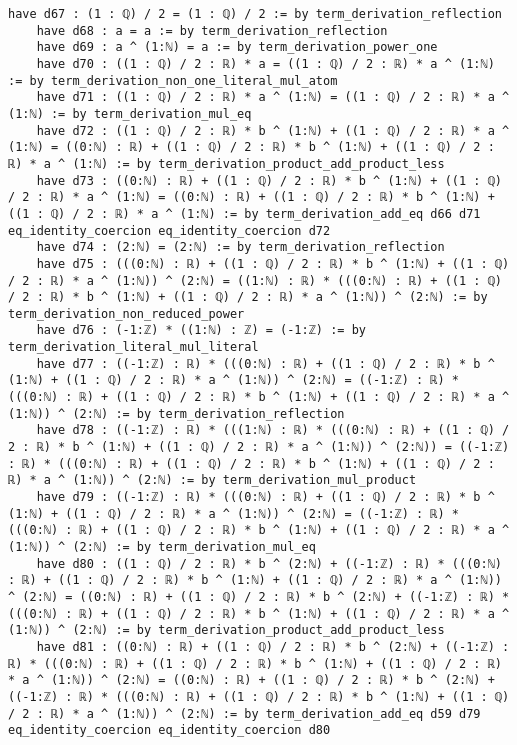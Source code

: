 \documentclass{article}
\begin{document}
\begin{tcolorbox}[colback=white!10, width=\linewidth]
\begin{lstlisting}[language=Lean4]
    have d67 : (1 : ℚ) / 2 = (1 : ℚ) / 2 := by term_derivation_reflection
    have d68 : a = a := by term_derivation_reflection
    have d69 : a ^ (1:ℕ) = a := by term_derivation_power_one
    have d70 : ((1 : ℚ) / 2 : ℝ) * a = ((1 : ℚ) / 2 : ℝ) * a ^ (1:ℕ) := by term_derivation_non_one_literal_mul_atom
    have d71 : ((1 : ℚ) / 2 : ℝ) * a ^ (1:ℕ) = ((1 : ℚ) / 2 : ℝ) * a ^ (1:ℕ) := by term_derivation_mul_eq
    have d72 : ((1 : ℚ) / 2 : ℝ) * b ^ (1:ℕ) + ((1 : ℚ) / 2 : ℝ) * a ^ (1:ℕ) = ((0:ℕ) : ℝ) + ((1 : ℚ) / 2 : ℝ) * b ^ (1:ℕ) + ((1 : ℚ) / 2 : ℝ) * a ^ (1:ℕ) := by term_derivation_product_add_product_less
    have d73 : ((0:ℕ) : ℝ) + ((1 : ℚ) / 2 : ℝ) * b ^ (1:ℕ) + ((1 : ℚ) / 2 : ℝ) * a ^ (1:ℕ) = ((0:ℕ) : ℝ) + ((1 : ℚ) / 2 : ℝ) * b ^ (1:ℕ) + ((1 : ℚ) / 2 : ℝ) * a ^ (1:ℕ) := by term_derivation_add_eq d66 d71 eq_identity_coercion eq_identity_coercion d72
    have d74 : (2:ℕ) = (2:ℕ) := by term_derivation_reflection
    have d75 : (((0:ℕ) : ℝ) + ((1 : ℚ) / 2 : ℝ) * b ^ (1:ℕ) + ((1 : ℚ) / 2 : ℝ) * a ^ (1:ℕ)) ^ (2:ℕ) = ((1:ℕ) : ℝ) * (((0:ℕ) : ℝ) + ((1 : ℚ) / 2 : ℝ) * b ^ (1:ℕ) + ((1 : ℚ) / 2 : ℝ) * a ^ (1:ℕ)) ^ (2:ℕ) := by term_derivation_non_reduced_power
    have d76 : (-1:ℤ) * ((1:ℕ) : ℤ) = (-1:ℤ) := by term_derivation_literal_mul_literal
    have d77 : ((-1:ℤ) : ℝ) * (((0:ℕ) : ℝ) + ((1 : ℚ) / 2 : ℝ) * b ^ (1:ℕ) + ((1 : ℚ) / 2 : ℝ) * a ^ (1:ℕ)) ^ (2:ℕ) = ((-1:ℤ) : ℝ) * (((0:ℕ) : ℝ) + ((1 : ℚ) / 2 : ℝ) * b ^ (1:ℕ) + ((1 : ℚ) / 2 : ℝ) * a ^ (1:ℕ)) ^ (2:ℕ) := by term_derivation_reflection
    have d78 : ((-1:ℤ) : ℝ) * (((1:ℕ) : ℝ) * (((0:ℕ) : ℝ) + ((1 : ℚ) / 2 : ℝ) * b ^ (1:ℕ) + ((1 : ℚ) / 2 : ℝ) * a ^ (1:ℕ)) ^ (2:ℕ)) = ((-1:ℤ) : ℝ) * (((0:ℕ) : ℝ) + ((1 : ℚ) / 2 : ℝ) * b ^ (1:ℕ) + ((1 : ℚ) / 2 : ℝ) * a ^ (1:ℕ)) ^ (2:ℕ) := by term_derivation_mul_product
    have d79 : ((-1:ℤ) : ℝ) * (((0:ℕ) : ℝ) + ((1 : ℚ) / 2 : ℝ) * b ^ (1:ℕ) + ((1 : ℚ) / 2 : ℝ) * a ^ (1:ℕ)) ^ (2:ℕ) = ((-1:ℤ) : ℝ) * (((0:ℕ) : ℝ) + ((1 : ℚ) / 2 : ℝ) * b ^ (1:ℕ) + ((1 : ℚ) / 2 : ℝ) * a ^ (1:ℕ)) ^ (2:ℕ) := by term_derivation_mul_eq
    have d80 : ((1 : ℚ) / 2 : ℝ) * b ^ (2:ℕ) + ((-1:ℤ) : ℝ) * (((0:ℕ) : ℝ) + ((1 : ℚ) / 2 : ℝ) * b ^ (1:ℕ) + ((1 : ℚ) / 2 : ℝ) * a ^ (1:ℕ)) ^ (2:ℕ) = ((0:ℕ) : ℝ) + ((1 : ℚ) / 2 : ℝ) * b ^ (2:ℕ) + ((-1:ℤ) : ℝ) * (((0:ℕ) : ℝ) + ((1 : ℚ) / 2 : ℝ) * b ^ (1:ℕ) + ((1 : ℚ) / 2 : ℝ) * a ^ (1:ℕ)) ^ (2:ℕ) := by term_derivation_product_add_product_less
    have d81 : ((0:ℕ) : ℝ) + ((1 : ℚ) / 2 : ℝ) * b ^ (2:ℕ) + ((-1:ℤ) : ℝ) * (((0:ℕ) : ℝ) + ((1 : ℚ) / 2 : ℝ) * b ^ (1:ℕ) + ((1 : ℚ) / 2 : ℝ) * a ^ (1:ℕ)) ^ (2:ℕ) = ((0:ℕ) : ℝ) + ((1 : ℚ) / 2 : ℝ) * b ^ (2:ℕ) + ((-1:ℤ) : ℝ) * (((0:ℕ) : ℝ) + ((1 : ℚ) / 2 : ℝ) * b ^ (1:ℕ) + ((1 : ℚ) / 2 : ℝ) * a ^ (1:ℕ)) ^ (2:ℕ) := by term_derivation_add_eq d59 d79 eq_identity_coercion eq_identity_coercion d80

\end{lstlisting}
\end{tcolorbox}
\end{document}
